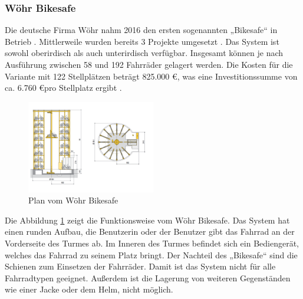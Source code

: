\subsubsection{Wöhr Bikesafe}
Die deutsche Firma Wöhr nahm 2016 den ersten sogenannten „Bikesafe“ in Betrieb . Mittlerweile wurden bereits 3 Projekte umgesetzt . Das System ist sowohl oberirdisch als auch unterirdisch verfügbar. Insgesamt können je nach Ausführung zwischen 58 und 192 Fahrräder gelagert werden. Die Kosten für die Variante mit 122 Stellplätzen beträgt 825.000 \euro, was eine Investitionssumme von ca. 6.760 \euro  pro Stellplatz ergibt \cite*{richtpreisangebot}.

\begin{figure}[H]
  \centering
  \includegraphics[width=0.5\textwidth]{images/bikesafe.png}
  \caption{Plan vom Wöhr Bikesafe }
  \label{fig:bikesafe}
\end{figure}

\noindent Die Abbildung \ref{fig:bikesafe} zeigt die Funktionsweise vom Wöhr Bikesafe. Das System hat einen runden Aufbau, die Benutzerin oder der Benutzer gibt das Fahrrad an der Vorderseite des Turmes ab. Im Inneren des Turmes befindet sich ein Bediengerät, welches das Fahrrad zu seinem Platz bringt.
\noindent Der Nachteil des „Bikesafe“ sind die Schienen zum Einsetzen der Fahrräder. Damit ist das System nicht für alle Fahrradtypen geeignet. Außerdem ist die Lagerung von weiteren Gegenständen wie einer Jacke oder dem Helm, nicht möglich.
